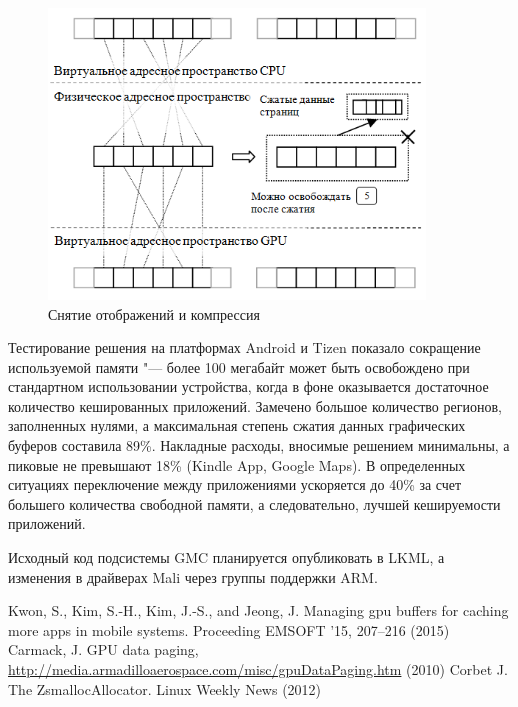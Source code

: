 \documentclass[10pt, a5paper]{article}
\begin{document}
\begin{figure}[h!]
  \centering
  \includegraphics[width=10cm]{18_2016_Rogachev3.png}
  \caption{Снятие отображений и компрессия}
  \label{Rogachev3}
\end{figure}

Тестирование решения на платформах Android и Tizen показало сокращение используемой памяти "--- более 100 мегабайт может быть освобождено при стандартном использовании устройства, когда в фоне оказывается достаточное количество кешированных приложений. Замечено большое количество регионов, заполненных нулями, а максимальная степень сжатия данных графических буферов составила 89\%. Накладные расходы, вносимые решением минимальны, а пиковые не превышают 18\% (Kindle App, Google Maps). В определенных ситуациях переключение между приложениями ускоряется до 40\% за счет большего количества свободной памяти, а следовательно, лучшей кешируемости приложений.

Исходный код подсистемы GMC планируется опубликовать в LKML, а изменения в драйверах Mali через группы поддержки ARM.

\begin{thebibliography}{99}
 Kwon, S., Kim, S.-H., Kim, J.-S., and Jeong, J. Managing gpu buffers for caching more apps in mobile systems. Proceeding EMSOFT '15, 207–216 (2015)
 Carmack, J. GPU data paging, \url{http://media.armadilloaerospace.com/misc/gpuDataPaging.htm} (2010)
 Corbet J. The ZsmallocAllocator. Linux Weekly News (2012)
\end{thebibliography}
\end{document}
